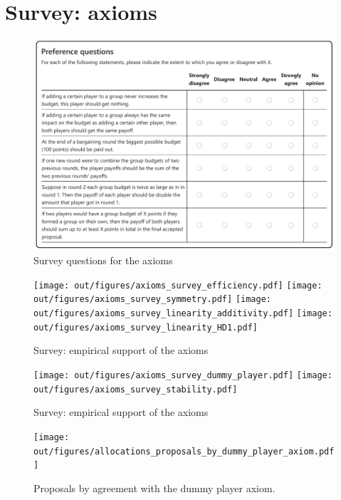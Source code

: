 \documentclass[12pt]{article}
\begin{document}
\section{Survey: axioms}

\begin{figure}[!htb]
    \centering
    \includegraphics[width=.9\linewidth]{screenshots/survey_axioms.pdf}
    \caption{Survey questions for the axioms}
    \label{fig:survey_axioms_questions}
\end{figure}



\begin{figure}
    \centering
    \texttt{[image: out/figures/axioms\_survey\_efficiency.pdf]}
    \texttt{[image: out/figures/axioms\_survey\_symmetry.pdf]}
    \texttt{[image: out/figures/axioms\_survey\_linearity\_additivity.pdf]}
    \texttt{[image: out/figures/axioms\_survey\_linearity\_HD1.pdf]}
    \caption{Survey: empirical support of the axioms}
    \label{fig:axioms_survey_1}
\end{figure}

\begin{figure}
    \ContinuedFloat
    \centering
    \texttt{[image: out/figures/axioms\_survey\_dummy\_player.pdf]}
    \texttt{[image: out/figures/axioms\_survey\_stability.pdf]}
    \caption{Survey: empirical support of the axioms}
    \label{fig:axioms_survey_2}
\end{figure}


\begin{figure}
    \centering
    \texttt{[image: out/figures/allocations\_proposals\_by\_dummy\_player\_axiom.pdf]}
    \caption{Proposals by agreement with the dummy player axiom.}
    \label{fig:axioms_proposals_dummy_player}
\end{figure}
\end{document}
